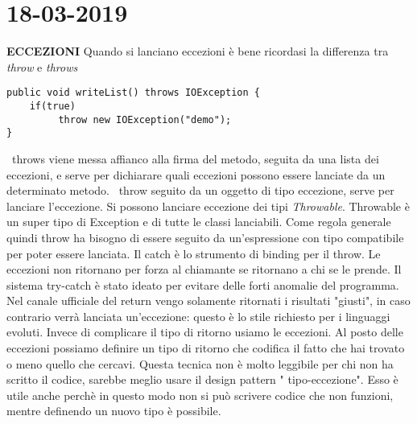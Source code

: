 

\newpage
\section{18-03-2019}
\textbf{ECCEZIONI} \newline
Quando si lanciano eccezioni è bene ricordasi la differenza tra \textit{throw} e \textit{throws}
\begin{lstlisting}[basicstyle=\small,]
public void writeList() throws IOException {
	if(true)
		 throw new IOException("demo"); 
}
\end{lstlisting}
\textbullet\ throws viene messa affianco alla firma del metodo, seguita da una lista dei eccezioni, e serve per dichiarare quali eccezioni possono essere lanciate da un determinato metodo. \newline
\textbullet\ throw seguito da un oggetto di tipo eccezione, serve per lanciare l'eccezione. \newline
Si possono lanciare eccezione dei tipi \textit{Throwable}. Throwable è un super tipo di Exception e di tutte le classi lanciabili. \newline
Come regola generale quindi throw ha bisogno di essere seguito da un'espressione con tipo compatibile per poter essere lanciata.\newline
Il catch è lo strumento di binding per il throw. \newline
Le eccezioni non ritornano  per forza al chiamante se ritornano a chi se le prende. \newline
Il sistema try-catch è stato ideato per evitare delle forti anomalie del programma. \newline
Nel canale ufficiale del return vengo solamente ritornati i risultati "giusti", in caso contrario verrà lanciata un'eccezione: questo è lo stile richiesto per i linguaggi evoluti. Invece di complicare il tipo di ritorno usiamo le eccezioni. \newline
Al posto delle eccezioni possiamo definire  un tipo di ritorno che codifica il fatto che hai trovato o meno quello che cercavi. Questa tecnica non è molto leggibile per chi non ha scritto il codice, sarebbe meglio usare il design pattern " tipo-eccezione". Esso è utile anche perchè in questo modo non si può scrivere codice che non funzioni, mentre definendo un nuovo tipo è possibile.

\newpage






